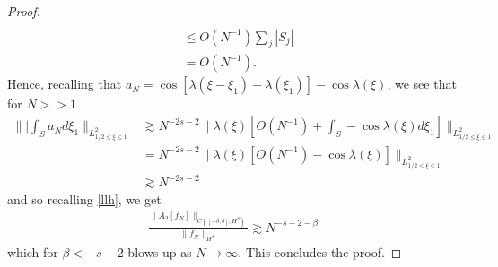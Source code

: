 \documentclass[12pt,reqno]{amsart}
\numberwithin{equation}{section}  %
\begin{document}
\begin{proof}
\begin{equation*}
\begin{split}
  \\
  & \le O(N^{-1}) \sum_{j} | S_{j} |
  \\
  & = O(N^{-1}).
\end{split}
\end{equation*}
%
%
Hence, recalling that $a_{N} =   \cos[\lambda(\xi - \xi_{1}) - \lambda(\xi_{1})] - \cos \lambda(\xi)$, we see that for $N >>1$
%
%
\begin{equation*}
\begin{split}
\| | \int_{S}a_{N} d \xi_{1} \|_{L^{2}_{1/2 \le \xi \le 1}}
& \gtrsim N^{-2s -2}\| \lambda(\xi) \left [ O(N^{-1}) +  \int_{S} -\cos \lambda(\xi) d \xi_{1} \right ] \|_{L^{2}_{1/2 \le \xi \le 1}}
\\
& = N^{-2s-2} \| \lambda(\xi)\left [ O(N^{-1}) - \cos \lambda(\xi) \right ] \|_{L^{2}_{1/2 \le \xi \le 1}}
\\
& \gtrsim N^{-2s-2}
\end{split}
\end{equation*}
%
and so recalling \eqref{llh}, we get
%
%
\begin{equation*}
\begin{split}
\frac{\|A_{2}[f_{N}]\|_{C([-\delta, \delta], H^{\beta})}}{\| f_{N}
\|_{H^{\beta}}} \gtrsim N^{-s -2 - \beta} 
\end{split}
\end{equation*}
%
%
which for $\beta < -s-2$ blows up as $N \to \infty$. This concludes the proof.
%
%
\end{proof}
%
%
%
%
%
%
%
%
%
%
%
%
%
%
%
\end{document}
